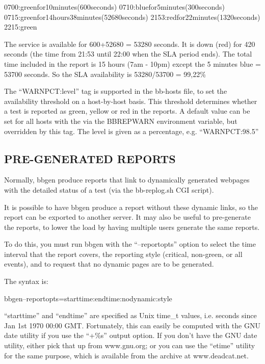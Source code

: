   
0700:greenfor10minutes(600seconds)  
0710:bluefor5minutes(300seconds)  
0715:greenfor14hours38minutes(52680seconds)  
2153:redfor22minutes(1320seconds)  
2215:green 


  The service is available for 600+52680 = 53280 seconds. It is down
  (red) for 420 seconds (the time from 21:53 until 22:00 when the SLA
  period ends). The total time included in the report is 15 hours (7am
  - 10pm) except the 5 minutes blue = 53700 seconds. So the SLA
  availability is 53280/53700 = 99,22\% 



  The ``WARNPCT:level'' tag is supported in the bb-hosts file, to set
  the availability threshold on a host-by-host basis. This threshold
  determines whether a test is reported as green, yellow or red in the
  reports. A default value can be set for all hosts with the via the
  BBREPWARN environment variable, but overridden by this tag. The
  level is given as a percentage, e.g. ``WARNPCT:98.5'' 

 
\subsection{PRE-GENERATED REPORTS}
 Normally, bbgen produce reports that link to dynamically generated webpages with the detailed status of a test (via the bb-replog.sh CGI script). 

  It is possible to have bbgen produce a report without these dynamic
  links, so the report can be exported to another server. It may also
  be useful to pre-generate the reports, to lower the load by having
  multiple users generate the same reports. 



  To do this, you must run bbgen with the ``--reportopts'' option to
  select the time interval that the report covers, the reporting style
  (critical, non-green, or all events), and to request that no dynamic
  pages are to be generated. 



  The syntax is: 


  
bbgen--reportopts=starttime:endtime:nodynamic:style 


  ``starttime'' and ``endtime'' are specified as Unix time\_t values,
  i.e. seconds since Jan 1st 1970 00:00 GMT. Fortunately, this can
  easily be computed with the GNU date utility if you use the ``+\%s''
  output option. If you don't have the GNU date utility, either pick
  that up from www.gnu.org; or you can use the ``etime'' utility for
  the same purpose, which is available from the archive at
  www.deadcat.net. 



